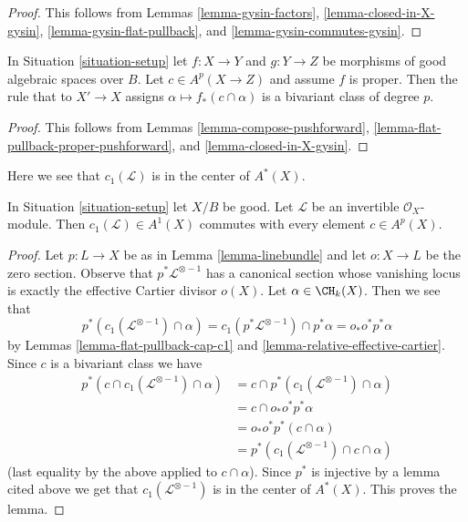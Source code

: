\begin{proof}
This follows from Lemmas \ref{lemma-gysin-factors},
\ref{lemma-closed-in-X-gysin},
\ref{lemma-gysin-flat-pullback}, and
\ref{lemma-gysin-commutes-gysin}.
\end{proof}

\begin{lemma}
\label{lemma-push-proper-bivariant}
In Situation \ref{situation-setup} let $f : X \to Y$ and
$g : Y \to Z$ be morphisms of good algebraic spaces over $B$.
Let $c \in A^p(X \to Z)$ and assume $f$ is proper.
Then the rule that to $X' \to X$ assigns
$\alpha \longmapsto f_*(c \cap \alpha)$
is a bivariant class of degree $p$.
\end{lemma}

\begin{proof}
This follows from Lemmas \ref{lemma-compose-pushforward},
\ref{lemma-flat-pullback-proper-pushforward}, and
\ref{lemma-closed-in-X-gysin}.
\end{proof}

\noindent
Here we see that $c_1(\mathcal{L})$ is in the center of $A^*(X)$.

\begin{lemma}
\label{lemma-c1-center}
In Situation \ref{situation-setup} let $X/B$ be good.
Let $\mathcal{L}$ be an invertible $\mathcal{O}_X$-module.
Then $c_1(\mathcal{L}) \in A^1(X)$ commutes with every
element $c \in A^p(X)$.
\end{lemma}

\begin{proof}
Let $p : L \to X$ be as in Lemma \ref{lemma-linebundle} and let $o : X \to L$
be the zero section. Observe that $p^*\mathcal{L}^{\otimes -1}$ has a
canonical section whose vanishing locus is exactly the
effective Cartier divisor $o(X)$. Let $\alpha \in \CH_k(X)$. Then we see that
$$
p^*(c_1(\mathcal{L}^{\otimes -1}) \cap \alpha) =
c_1(p^*\mathcal{L}^{\otimes -1}) \cap p^*\alpha =
o_* o^* p^*\alpha
$$
by Lemmas \ref{lemma-flat-pullback-cap-c1} and
\ref{lemma-relative-effective-cartier}.
Since $c$ is a bivariant class we have
\begin{align*}
p^*(c \cap c_1(\mathcal{L}^{\otimes -1}) \cap \alpha)
& =
c \cap p^*(c_1(\mathcal{L}^{\otimes -1}) \cap \alpha) \\
& =
c \cap o_* o^* p^*\alpha \\
& =
o_* o^* p^*(c \cap \alpha) \\
& =
p^*(c_1(\mathcal{L}^{\otimes -1}) \cap c \cap \alpha)
\end{align*}
(last equality by the above applied to $c \cap \alpha$).
Since $p^*$ is injective by a lemma cited above we get that
$c_1(\mathcal{L}^{\otimes -1})$
is in the center of $A^*(X)$. This proves the lemma.
\end{proof}

